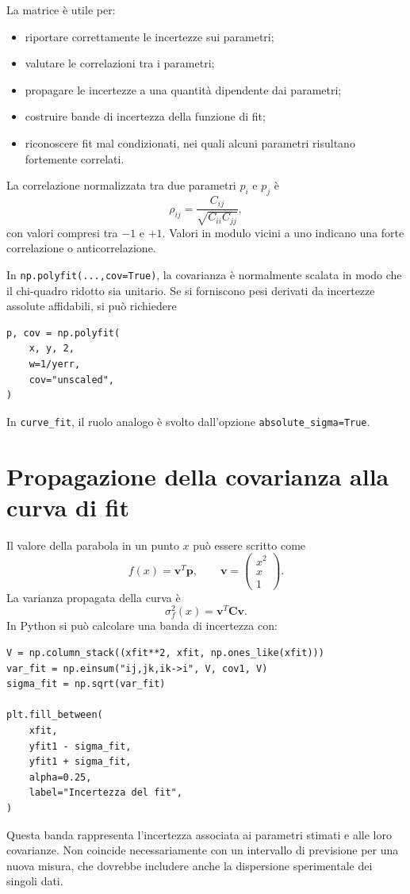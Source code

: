 \documentclass[11pt,a4paper]{book}
\begin{document}
La matrice è utile per:
\begin{itemize}
  \item riportare correttamente le incertezze sui parametri;
  \item valutare le correlazioni tra i parametri;
  \item propagare le incertezze a una quantità dipendente dai parametri;
  \item costruire bande di incertezza della funzione di fit;
  \item riconoscere fit mal condizionati, nei quali alcuni parametri risultano fortemente correlati.
\end{itemize}

La correlazione normalizzata tra due parametri $p_i$ e $p_j$ è
\[
 \rho_{ij}=\frac{C_{ij}}{\sqrt{C_{ii}C_{jj}}},
\]
con valori compresi tra $-1$ e $+1$. Valori in modulo vicini a uno indicano una forte correlazione o anticorrelazione.

In \texttt{np.polyfit(...,cov=True)}, la covarianza è normalmente scalata in modo che il chi-quadro ridotto sia unitario. Se si forniscono pesi derivati da incertezze assolute affidabili, si può richiedere
\begin{lstlisting}
p, cov = np.polyfit(
    x, y, 2,
    w=1/yerr,
    cov="unscaled",
)
\end{lstlisting}
In \texttt{curve\_fit}, il ruolo analogo è svolto dall'opzione \texttt{absolute\_sigma=True}.

\section{Propagazione della covarianza alla curva di fit}
Il valore della parabola in un punto $x$ può essere scritto come
\[
 f(x)=\mathbf{v}^{T}\mathbf{p},
 \qquad
 \mathbf{v}=\begin{pmatrix}x^2\\x\\1\end{pmatrix}.
\]
La varianza propagata della curva è
\[
 \sigma_f^2(x)=\mathbf{v}^{T}\mathbf{C}\mathbf{v}.
\]
In Python si può calcolare una banda di incertezza con:
\begin{lstlisting}
V = np.column_stack((xfit**2, xfit, np.ones_like(xfit)))
var_fit = np.einsum("ij,jk,ik->i", V, cov1, V)
sigma_fit = np.sqrt(var_fit)

plt.fill_between(
    xfit,
    yfit1 - sigma_fit,
    yfit1 + sigma_fit,
    alpha=0.25,
    label="Incertezza del fit",
)
\end{lstlisting}
Questa banda rappresenta l'incertezza associata ai parametri stimati e alle loro covarianze. Non coincide necessariamente con un intervallo di previsione per una nuova misura, che dovrebbe includere anche la dispersione sperimentale dei singoli dati.
\end{document}
